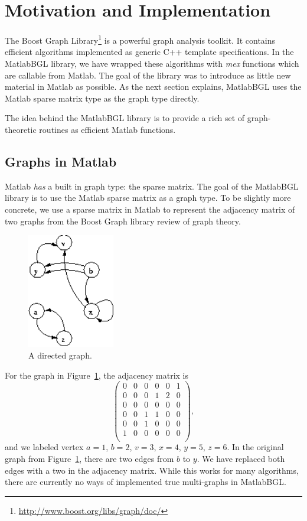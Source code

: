 \documentclass[12pt]{article}
\begin{document}
\section{Motivation and Implementation}
The Boost Graph Library\footnote{\url{http://www.boost.org/libs/graph/doc/}} is a powerful graph analysis toolkit.  It contains efficient algorithms implemented as generic C++ template specifications.  In the MatlabBGL library, we have wrapped these algorithms with \emph{mex} functions which are callable from Matlab.  The goal of the library was to introduce as little new material in Matlab as possible.  As the next section explains, MatlabBGL uses the Matlab sparse matrix type as the graph type directly.

The idea behind the MatlabBGL library is to provide a rich set of graph-theoretic routines as efficient Matlab functions.  

\subsection{Graphs in Matlab}
Matlab \emph{has} a built in graph type: the sparse matrix.  The goal of the MatlabBGL library is to use the Matlab sparse matrix as a graph type.  To be slightly more concrete, we use a sparse matrix in Matlab to represent the adjacency matrix of two graphs from the Boost Graph library review of graph theory.

\begin{figure}[ht!]
\centering
\includegraphics[width=1.5in]{digraph}
\caption{A directed graph.}
\label{fig:digraph}
\end{figure}

For the graph in Figure~\ref{fig:digraph}, the adjacency matrix is 
\[ \begin{pmatrix}
     0  &    0  &   0  &   0  &   0 &    1\\
     0  &   0  &   0   &  1  &   2  &   0\\
     0  &   0  &   0   &  0  &   0  &   0\\
     0  &   0  &   1   &  1  &   0  &   0\\
     0  &   0  &   1   &  0  &   0  &   0\\
     1  &   0  &   0   &  0  &   0  &   0\\
     \end{pmatrix},\]
and we labeled vertex $a=1$, $b=2$, $v=3$, $x=4$, $y=5$, $z=6$.  In the original graph from Figure~\ref{fig:digraph}, there are two edges from $b$ to $y$.  We have replaced both edges with a two in the adjacency matrix.  While this works for many algorithms, there are currently no ways of implemented true multi-graphs in MatlabBGL.
\end{document}
